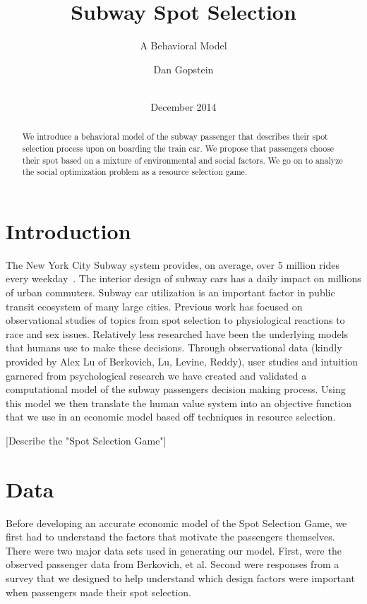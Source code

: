 \documentclass{acm_proc_article-sp}
\begin{document}
\title{Subway Spot Selection}
\subtitle{A Behavioral Model}

\author{
\alignauthor
       Dan Gopstein\\
       \\
}

\date{December 2014}


\maketitle
\begin{abstract}
We introduce a behavioral model of the subway passenger that describes their spot selection process upon on boarding the train car. We propose that passengers choose their spot based on a mixture of environmental and social factors. We go on to analyze the social optimization problem as a resource selection game.
\end{abstract}

\section{Introduction}
The New York City Subway system provides, on average, over 5 million rides every weekday~\cite{MTAFacts}. The interior design of subway cars has a daily impact on millions of urban commuters. Subway car utilization is an important factor in public transit ecosystem of many large cities. Previous work has focused on observational studies of topics from spot selection\cite{berkovich2013observed} to physiological reactions\cite{evans2007crowding} to race\cite{maines1979ecological} and sex\cite{hai1982sex} issues. Relatively less researched have been the underlying models that humans use to make these decisions. Through observational data (kindly provided by Alex Lu of Berkovich, Lu, Levine, Reddy), user studies and intuition garnered from psychological research\cite{evans2007crowding, hai1982sex, maines1979ecological} we have created and validated a computational model of the subway passengers decision making process. Using this model we then translate the human value system into an objective function that we use in an economic model based off techniques in resource selection.

[Describe the "Spot Selection Game"]

\section{Data}
Before developing an accurate economic model of the Spot Selection Game, we first had to understand the factors that motivate the passengers themselves. There were two major data sets used in generating our model. First, were the observed passenger data from Berkovich, et al. Second were responses from a survey that we designed to help understand which design factors were important when passengers made their spot selection.
\end{document}
